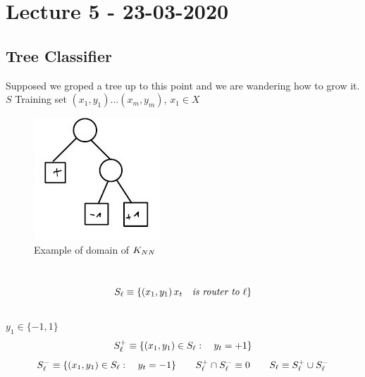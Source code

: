 \documentclass[../main.tex]{subfiles}
\begin{document}
\chapter{Lecture 5 - 23-03-2020}

\section{Tree Classifier}

Supposed we groped a tree up to this point and we are wandering how to
grow it.
\\
$S$ Training set $(x_1,y_1)...(x_m,y_m)$, $x_1 \in X$
\\
\begin{figure}[h]
    \centering
    \includegraphics[width=0.4\linewidth]{../img/lez5-img1.JPG}
    \caption{Example of domain of $K_{NN}$}
\end{figure}
\\
$$
S_{\ell} \equiv \{(x_1,y_1) \, x_t \quad \textit{is router to } \ell \}
$$
\\
$y_1 \in \{-1,1\}$
\\
$$
S_{\ell} ^+ \equiv \{(x_1,y_1) \in S_{\ell} : \quad y_t = +1 \} 
$$
$$
S_{\ell}^- \equiv \{(x_1,y_1) \in S_{\ell} : \quad  y_t = -1 \} 
\qquad
S_{\ell}^+ \cap S_{\ell}^- \equiv 0 \qquad S_{\ell} \equiv S_{\ell}^+ \cup S_{\ell}^-
$$
\end{document}
